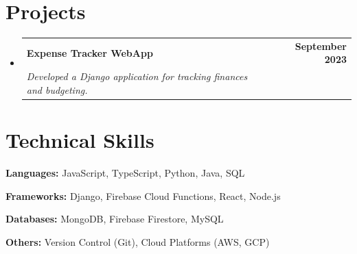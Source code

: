 \documentclass[letterpaper,11pt]{article}
\makeatletter
\newcommand{\resumeSubheading}[4]{
\vspace{-2pt}\item
    \begin{tabular*}{1.0\textwidth}[t]{l@{\extracolsep{\fill}}r}
    \textbf{#1} & \textbf{\small #2} \\
    \textit{\small#3} & \textit{\small #4} \\
    \end{tabular*}\vspace{-7pt}
}
\newcommand{\resumeSubHeadingListStart}{\begin{itemize}[leftmargin=0.0in, label={}]}
\newcommand{\resumeSubHeadingListEnd}{\end{itemize}}
\makeatother
\begin{document}
\section{Projects}
\resumeSubHeadingListStart
    \resumeSubheading
    {\textbf{Expense Tracker WebApp}}{September 2023}
    {Developed a Django application for tracking finances and budgeting.}{}
    \resumeSubHeadingListEnd

\section{Technical Skills}
\begin{itemize}[leftmargin=0.15in]
\small{
    \item \textbf{Languages:} JavaScript, TypeScript, Python, Java, SQL
    \item \textbf{Frameworks:} Django, Firebase Cloud Functions, React, Node.js
    \item \textbf{Databases:} MongoDB, Firebase Firestore, MySQL
    \item \textbf{Others:} Version Control (Git), Cloud Platforms (AWS, GCP)
}
\end{itemize}
\end{document}
